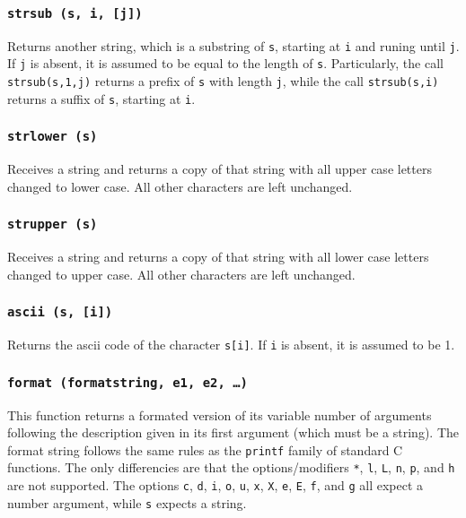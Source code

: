 \subsubsection*{{\tt strsub (s, i, [j])}}
Returns another string, which is a substring of \verb's',
starting at \verb'i'  and runing until \verb'j'.
If \verb'j' is absent,
it is assumed to be equal to the length of \verb's'.
Particularly, the call \verb'strsub(s,1,j)' returns a prefix of \verb's'
with length \verb'j',
while the call \verb'strsub(s,i)' returns a suffix of \verb's',
starting at \verb'i'.

\subsubsection*{{\tt strlower (s)}}
Receives a string and returns a copy of that string with all
upper case letters changed to lower case.
All other characters are left unchanged.

\subsubsection*{{\tt strupper (s)}}
Receives a string and returns a copy of that string with all
lower case letters changed to upper case.
All other characters are left unchanged.

\subsubsection*{{\tt ascii (s, [i])}}
Returns the ascii code of the character \verb's[i]'.
If \verb'i' is absent, it is assumed to be 1.

\subsubsection*{{\tt format (formatstring, e1, e2, \ldots)}}
This function returns a formated version of its variable number of arguments
following the description given in its first argument (which must be a string). 
The format string follows the same rules as the \verb'printf' family of
standard C functions.
The only differencies are that the options/modifiers
 \verb'*', \verb'l', \verb'L', \verb'n', \verb'p',
 and \verb'h' are not supported.
The options \verb'c',  \verb'd',  \verb'i', \verb'o', \verb'u', 
\verb'x',  \verb'X', \verb'e',  \verb'E', \verb'f', and \verb'g' all
expect a number argument,
while \verb's' expects a string.


